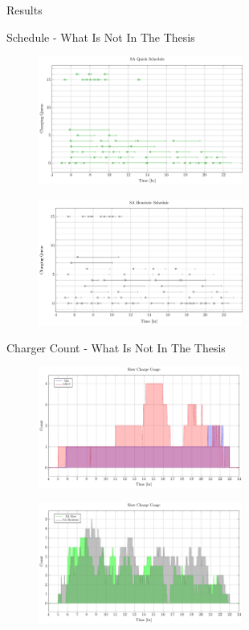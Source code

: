 \documentclass[aspectratio=169]{beamer}
\begin{document}
\begin{frame}[label={sec:org4ee59dd}]{Results}
\begin{frame}[label={sec:org539d28c}]{Schedule - What Is Not In The Thesis}
\begin{figure}[htpb]
\centering
    \includegraphics[width=0.6\textwidth]{img/sa-pap-paper-good/schedule-sa-quick}
\end{figure}
\begin{figure}[htpb]
\centering
    \includegraphics[width=0.6\textwidth]{img/sa-pap-paper-good/schedule-sa-heuristic}
\end{figure}
\end{frame}

\begin{frame}[label={sec:orgc790b73}]{Charger Count - What Is Not In The Thesis}
\begin{figure}[htpb]
\centering
    \includegraphics[width=0.6\textwidth]{img/sa-pap-paper-good/charger-count-slow-milp-qin}
\end{figure}
\begin{figure}[htpb]
\centering
    \includegraphics[width=0.6\textwidth]{img/sa-pap-paper-good/charger-count-slow-sa}
\end{figure}
\end{frame}


\end{frame}
\end{document}
